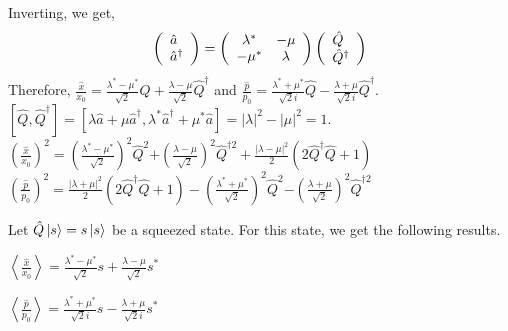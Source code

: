 \documentclass[12pt, twoside]{article}
\begin{document}
 Inverting, we get, 
 \begin{equation}
\left( \begin{array} { l } { \hat { a } } \\ { \hat { a } ^ { \dagger } } \end{array} \right) = \left( \begin{array} { c c } { \lambda^* } & { - \mu } \\ { - \mu ^ { * } } & { \lambda } \end{array} \right) \left( \begin{array} { l } { \hat{Q} } \\ { \hat{Q} ^ { \dagger } } \end{array} \right)
 \end{equation}
Therefore, $\frac { \hat { x } } { x _ { 0 } } = \frac { \lambda ^ { * } - \mu ^ { * } } { \sqrt { 2 } } \hat { Q } + \frac { \lambda - \mu } { \sqrt { 2 } } \hat { Q } ^ { \dagger }$ and $\frac { \hat { p } } { p _ { 0 } } = \frac { \lambda ^ { * } + \mu ^ { * } } { \sqrt { 2 }i } \hat { Q } - \frac { \lambda + \mu } { \sqrt { 2 } i} \hat { Q } ^ { \dagger }$. \\$[\hat{Q},\hat{Q}^\dagger] = \left[ \lambda \hat { a } + \mu \hat { a } ^ { \dagger } , \lambda ^ { * } \hat { a } ^ { \dagger} + \mu^{ * } \hat { a } \right] = | \lambda | ^ { 2 } - | \mu | ^ { 2 } = 1$.\\
$\left(\frac { \hat { x } } { x _ { 0 } }\right)^2 = { \left( \frac { \lambda ^ { * } - \mu ^ { * } } { \sqrt { 2 } } \right) ^ { 2 } \hat{Q} ^ { 2 } } { + \left( \frac { \lambda - \mu } { \sqrt { 2 } } \right) ^ { 2 } \hat{Q} ^ { \dagger 2 } } + \frac{|\lambda - \mu|^2}{2}(2\hat{ Q }^\dagger\hat{Q}+1)$\\
$\left(\frac { \hat { p } } { p _ { 0 } }\right)^2 = \frac{|\lambda + \mu|^2}{2}(2\hat{ Q }^\dagger \hat{Q}+1)-{ \left( \frac { \lambda ^ { * } + \mu ^ { * } } { \sqrt { 2 } } \right) ^ { 2 } \hat{Q} ^ { 2 } } { - \left( \frac { \lambda + \mu } { \sqrt { 2 } } \right) ^ { 2 } \hat{Q} ^ { \dagger 2 } }$

Let $\hat{Q}\ket{s} = s\ket{s}$ be a squeezed state. For this state, we get the following results.

$\left\langle \frac { \hat{x} } { x _ { 0 } } \right\rangle = \frac { \lambda ^ { * } - \mu ^ { * } } { \sqrt { 2 } } s + \frac { \lambda - \mu } { \sqrt { 2 } } s ^ { * }$

$\left\langle \frac{\hat { p }}{p_ { 0 }} \right\rangle = \frac { \lambda ^ { * } + \mu ^ { * } } { \sqrt { 2 } i } s - \frac { \lambda + \mu } { \sqrt { 2 } i } s ^ { * }$
\end{document}
